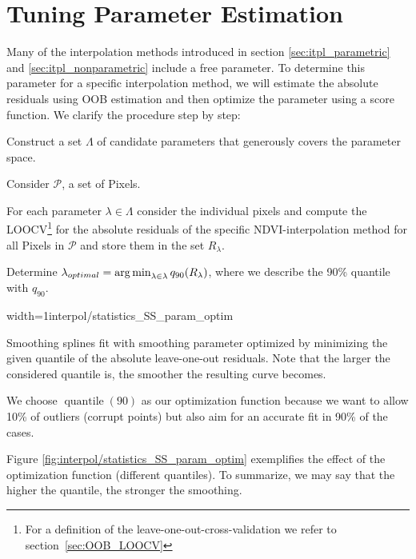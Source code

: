 
\section{Tuning Parameter Estimation}{ \label{sec:itpl_param_est}
	Many of the interpolation methods introduced in section \ref{sec:itpl_parametric} and \ref{sec:itpl_nonparametric} include a free parameter. To determine this parameter for a specific interpolation method, we will estimate the absolute residuals using OOB estimation and then optimize the parameter using a score function. We clarify the procedure step by step:	
	\begin{Nenumerate}
		\item Construct a set $\Lambda$ of candidate parameters that generously covers the parameter space.
		\item Consider $\mathcal{P}$, a set of Pixels.
		\item For each parameter $\lambda \in \Lambda$ consider the individual pixels and compute the LOOCV\footnote{For a definition of the leave-one-out-cross-validation we refer to section~\ref{sec:OOB_LOOCV}} for the absolute residuals of the specific NDVI-interpolation method for all Pixels in $\mathcal{P}$ and store them in the set $R_\lambda$. 
		\item Determine $\lambda_{optimal} = \operatorname*{arg\, min}_{\lambda\in\lambda}q_{90}(R_\lambda)$, where we describe the 90\% quantile with $q_{90}$.
	\end{Nenumerate}

	\begin{my_figure}[h]{width=1\textwidth}{interpol/statistics_SS_param_optim}
		\caption{Smoothing splines fit with smoothing parameter optimized by minimizing the given quantile of the absolute leave-one-out residuals. Note that the larger the considered quantile is, the smoother the resulting curve becomes.}
		\label{fig:interpol/statistics_SS_param_optim}
	\end{my_figure}

	We choose $\operatorname{quantile}(90)$ as our optimization function because we want to allow 10\% of outliers (corrupt points) but also aim for an accurate fit in 90\% of the cases.  
	
	Figure \ref{fig:interpol/statistics_SS_param_optim} exemplifies the effect of the optimization function (different quantiles). To summarize, we may say that the higher the quantile, the stronger the smoothing. 
}


